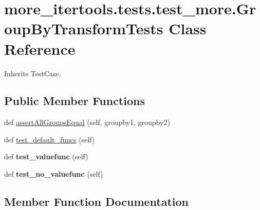 \hypertarget{classmore__itertools_1_1tests_1_1test__more_1_1_group_by_transform_tests}{}\section{more\+\_\+itertools.\+tests.\+test\+\_\+more.\+Group\+By\+Transform\+Tests Class Reference}
\label{classmore__itertools_1_1tests_1_1test__more_1_1_group_by_transform_tests}


Inherits Test\+Case.

\subsection*{Public Member Functions}
\begin{DoxyCompactItemize}
\item 
def \hyperlink{classmore__itertools_1_1tests_1_1test__more_1_1_group_by_transform_tests_a675ce65da4239e408fdd7095e576c945}{assert\+All\+Groups\+Equal} (self, groupby1, groupby2)
\item 
def \hyperlink{classmore__itertools_1_1tests_1_1test__more_1_1_group_by_transform_tests_a0e94b9a37b07e1cba2cf77cf94db0fb3}{test\+\_\+default\+\_\+funcs} (self)
\item 
\mbox{\label{classmore__itertools_1_1tests_1_1test__more_1_1_group_by_transform_tests_a0542722f3ff37ccd26897088774e260c}} 
def {\bfseries test\+\_\+valuefunc} (self)
\item 
\mbox{\label{classmore__itertools_1_1tests_1_1test__more_1_1_group_by_transform_tests_a73b067bb3cfbfac7f05c56a577e1e72e}} 
def {\bfseries test\+\_\+no\+\_\+valuefunc} (self)
\end{DoxyCompactItemize}


\subsection{Member Function Documentation}
\mbox{\label{classmore__itertools_1_1tests_1_1test__more_1_1_group_by_transform_tests_a675ce65da4239e408fdd7095e576c945}} 
